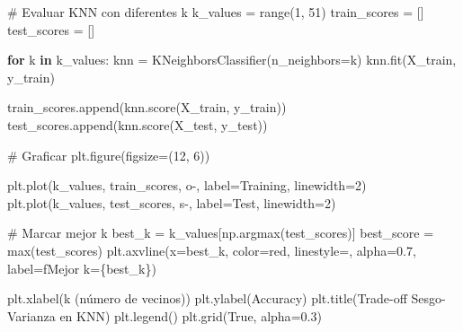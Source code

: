 \documentclass[
  doc,
  floatsintext,
  longtable,
  a4paper,
  nolmodern,
  notxfonts,
  notimes,
  12pt,
  colorlinks=true,linkcolor=blue,citecolor=blue,urlcolor=blue]{apa7}
\newenvironment{Shaded}{\begin{snugshade}}{\end{snugshade}}
\newcommand{\BuiltInTok}[1]{\textcolor[rgb]{0.00,0.23,0.31}{#1}}
\newcommand{\CommentTok}[1]{\textcolor[rgb]{0.37,0.37,0.37}{#1}}
\newcommand{\ControlFlowTok}[1]{\textcolor[rgb]{0.00,0.23,0.31}{\textbf{#1}}}
\newcommand{\DecValTok}[1]{\textcolor[rgb]{0.68,0.00,0.00}{#1}}
\newcommand{\FloatTok}[1]{\textcolor[rgb]{0.68,0.00,0.00}{#1}}
\newcommand{\KeywordTok}[1]{\textcolor[rgb]{0.00,0.23,0.31}{\textbf{#1}}}
\newcommand{\NormalTok}[1]{\textcolor[rgb]{0.00,0.23,0.31}{#1}}
\newcommand{\OperatorTok}[1]{\textcolor[rgb]{0.37,0.37,0.37}{#1}}
\newcommand{\SpecialCharTok}[1]{\textcolor[rgb]{0.37,0.37,0.37}{#1}}
\newcommand{\SpecialStringTok}[1]{\textcolor[rgb]{0.13,0.47,0.30}{#1}}
\newcommand{\StringTok}[1]{\textcolor[rgb]{0.13,0.47,0.30}{#1}}
\newcommand{\VariableTok}[1]{\textcolor[rgb]{0.07,0.07,0.07}{#1}}
\begin{document}
\begin{Shaded}
\begin{Highlighting}[]
\CommentTok{\# Evaluar KNN con diferentes k}
\NormalTok{k\_values }\OperatorTok{=} \BuiltInTok{range}\NormalTok{(}\DecValTok{1}\NormalTok{, }\DecValTok{51}\NormalTok{)}
\NormalTok{train\_scores }\OperatorTok{=}\NormalTok{ []}
\NormalTok{test\_scores }\OperatorTok{=}\NormalTok{ []}

\ControlFlowTok{for}\NormalTok{ k }\KeywordTok{in}\NormalTok{ k\_values:}
\NormalTok{    knn }\OperatorTok{=}\NormalTok{ KNeighborsClassifier(n\_neighbors}\OperatorTok{=}\NormalTok{k)}
\NormalTok{    knn.fit(X\_train, y\_train)}
    
\NormalTok{    train\_scores.append(knn.score(X\_train, y\_train))}
\NormalTok{    test\_scores.append(knn.score(X\_test, y\_test))}

\CommentTok{\# Graficar}
\NormalTok{plt.figure(figsize}\OperatorTok{=}\NormalTok{(}\DecValTok{12}\NormalTok{, }\DecValTok{6}\NormalTok{))}

\NormalTok{plt.plot(k\_values, train\_scores, }\StringTok{\textquotesingle{}o{-}\textquotesingle{}}\NormalTok{, label}\OperatorTok{=}\StringTok{\textquotesingle{}Training\textquotesingle{}}\NormalTok{, linewidth}\OperatorTok{=}\DecValTok{2}\NormalTok{)}
\NormalTok{plt.plot(k\_values, test\_scores, }\StringTok{\textquotesingle{}s{-}\textquotesingle{}}\NormalTok{, label}\OperatorTok{=}\StringTok{\textquotesingle{}Test\textquotesingle{}}\NormalTok{, linewidth}\OperatorTok{=}\DecValTok{2}\NormalTok{)}

\CommentTok{\# Marcar mejor k}
\NormalTok{best\_k }\OperatorTok{=}\NormalTok{ k\_values[np.argmax(test\_scores)]}
\NormalTok{best\_score }\OperatorTok{=} \BuiltInTok{max}\NormalTok{(test\_scores)}
\NormalTok{plt.axvline(x}\OperatorTok{=}\NormalTok{best\_k, color}\OperatorTok{=}\StringTok{\textquotesingle{}red\textquotesingle{}}\NormalTok{, linestyle}\OperatorTok{=}\StringTok{\textquotesingle{}{-}{-}\textquotesingle{}}\NormalTok{, alpha}\OperatorTok{=}\FloatTok{0.7}\NormalTok{,}
\NormalTok{            label}\OperatorTok{=}\SpecialStringTok{f\textquotesingle{}Mejor k=}\SpecialCharTok{\{}\NormalTok{best\_k}\SpecialCharTok{\}}\SpecialStringTok{\textquotesingle{}}\NormalTok{)}

\NormalTok{plt.xlabel(}\StringTok{\textquotesingle{}k (número de vecinos)\textquotesingle{}}\NormalTok{)}
\NormalTok{plt.ylabel(}\StringTok{\textquotesingle{}Accuracy\textquotesingle{}}\NormalTok{)}
\NormalTok{plt.title(}\StringTok{\textquotesingle{}Trade{-}off Sesgo{-}Varianza en KNN\textquotesingle{}}\NormalTok{)}
\NormalTok{plt.legend()}
\NormalTok{plt.grid(}\VariableTok{True}\NormalTok{, alpha}\OperatorTok{=}\FloatTok{0.3}\NormalTok{)}


\end{Highlighting}
\end{Shaded}
\end{document}
